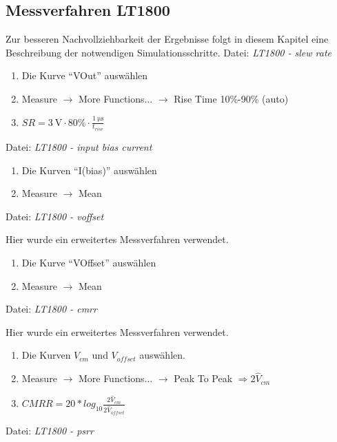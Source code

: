 \documentclass[
	ngerman,
	parskip=half,
	twocolumn,
	DIV=calc,
	]{scrartcl}
\begin{document}
	\subsection{Messverfahren LT1800}
	\label{sec:appendix_measurement_methods_LT1800}
	Zur besseren Nachvollziehbarkeit der Ergebnisse folgt in diesem Kapitel eine Beschreibung der notwendigen Simulationsschritte. 	
	Datei: \emph{LT1800 - slew rate}
	\begin{enumerate}
		\item Die Kurve \enquote{VOut} auswählen
		\item Measure $\rightarrow$ More Functions... $\rightarrow$ Rise Time 10\%-90\% (auto)
		\item $SR = \SI{3}{\volt} \cdot 80\% \cdot \frac{\SI{1}{\micro\second}}{t_{rise}}$
	\end{enumerate}
	
	Datei: \emph{LT1800 - input bias current}
	\begin{enumerate}
		\item Die Kurven \enquote{I(bias)} auswählen
		\item Measure $\rightarrow$ Mean
	\end{enumerate}
	
	Datei: \emph{LT1800 - voffset}
	
	Hier wurde ein erweitertes Messverfahren \cite{website:amp_psrr_cmrr_circuits} verwendet.
	\begin{enumerate}
		\item Die Kurve \enquote{VOffset} auswählen
		\item Measure $\rightarrow$ Mean
	\end{enumerate}
	
	Datei: \emph{LT1800 - cmrr}
	
	Hier wurde ein erweitertes Messverfahren \cite{website:amp_psrr_cmrr_circuits} verwendet.
	\begin{enumerate}
		\item Die Kurven $V_{cm}$ und $V_{offset}$ auswählen.
		\item Measure $\rightarrow$ More Functions... $\rightarrow$ Peak To Peak $\Rightarrow 2\hat{V}_{cm}$
		\item $ CMRR = 20 * log_{10} \frac{2\hat{V}_{cm}}{2\hat{V}_{offset}}$
	\end{enumerate}
	
	Datei: \emph{LT1800 - psrr}
	
\end{document}
